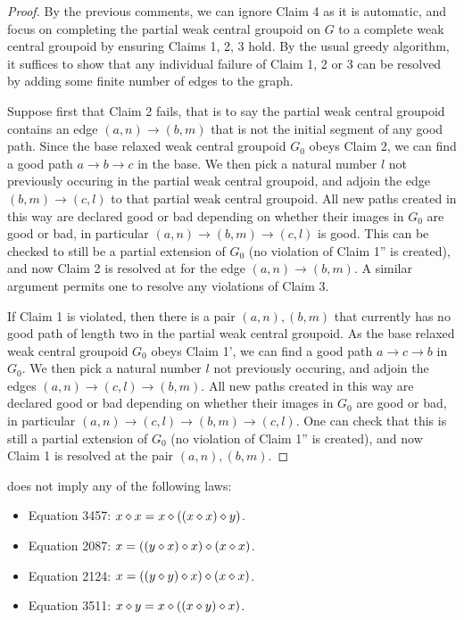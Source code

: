 \begin{proof}  By the previous comments, we can ignore Claim 4 as it is automatic, and focus on completing the partial weak central groupoid on $G$ to a complete weak central groupoid by ensuring Claims 1, 2, 3 hold.  By the usual greedy algorithm, it suffices to show that any individual failure of Claim 1, 2 or 3 can be resolved by adding some finite number of edges to the graph.

  Suppose first that Claim 2 fails, that is to say the partial weak central groupoid contains an edge $(a,n) \to (b,m)$ that is not the initial segment of any good path.  Since the base relaxed weak central groupoid $G_0$ obeys Claim 2, we can find a good path $a \to b \to c$ in the base.  We then pick a natural number $l$ not previously occuring in the partial weak central groupoid, and adjoin the edge $(b,m) \to (c,l)$ to that partial weak central groupoid.  All new paths created in this way are declared good or bad depending on whether their images in $G_0$ are good or bad, in particular $(a,n) \to (b,m) \to (c,l)$ is good.  This can be checked to still be a partial extension of $G_0$ (no violation of Claim 1'' is created), and now Claim 2 is resolved at for the edge $(a,n) \to (b,m)$.  A similar argument permits one to resolve any violations of Claim 3.

If Claim 1 is violated, then there is a pair $(a,n), (b,m)$ that currently has no good path of length two in the partial weak central groupoid.  As the base relaxed weak central groupoid $G_0$ obeys Claim 1', we can find a good path $a \to c \to b$ in $G_0$.  We then pick a natural number $l$ not previously occuring, and adjoin the edges $(a,n) \to (c,l) \to (b,m)$. All new paths created in this way are declared good or bad depending on whether their images in $G_0$ are good or bad, in particular $(a,n) \to (c,l) \to (b,m) \to (c,l)$.  One can check that this is still a partial extension of $G_0$ (no violation of Claim 1'' is created), and now Claim 1 is resolved at the pair $(a,n), (b,m)$.
\end{proof}

\begin{theorem}\label{1485-refutes}   does not imply any of the following laws:
\begin{itemize}
\item Equation 3457: $x \diamond x = x \diamond ((x \diamond x) \diamond y)$.
\item Equation 2087: $x = ((y \diamond x) \diamond x) \diamond (x \diamond x)$.
\item Equation 2124: $x = ((y \diamond y) \diamond x) \diamond (x \diamond x)$.
\item Equation 3511: $x \diamond y = x \diamond ((x \diamond y) \diamond x)$.
\end{itemize}
\end{theorem}

